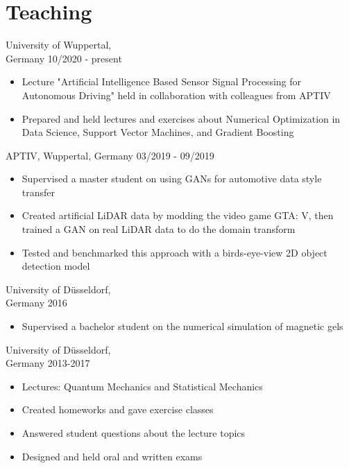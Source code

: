 \documentclass[singlesided,
               paper=a4,
               fontsize=10pt
              ]{my-resume}
\begin{document}
\section[\faBook]{Teaching}
    {University of Wuppertal,\\ Germany}
    {10/2020 - present}
    {\begin{itemize}[leftmargin=2em]
        \item Lecture "Artificial Intelligence Based Sensor Signal Processing for Autonomous Driving" held in collaboration with colleagues from APTIV
        \item Prepared and held lectures and exercises about Numerical Optimization in Data Science, Support Vector Machines, and Gradient Boosting
    \end{itemize}}
%
    {APTIV, Wuppertal, Germany}
    {03/2019 - 09/2019}
    {\begin{itemize}[leftmargin=2em]
        \item Supervised a master student on using GANs for automotive data style transfer
        \item Created artificial LiDAR data by modding the video game GTA: V, then trained a GAN on real LiDAR data to do the domain transform
        \item Tested and benchmarked this approach with a birds-eye-view 2D object detection model
    \end{itemize}}
%
    {University of Düsseldorf, \\ Germany}
    {2016}
    {\begin{itemize}[leftmargin=2em]
        \item Supervised a bachelor student on the numerical simulation of magnetic gels 
    \end{itemize}}
%
    {University of Düsseldorf, \\ Germany}
    {2013-2017}
    {\begin{itemize}[leftmargin=2em]
        \item Lectures: Quantum Mechanics and Statistical Mechanics
        \item Created homeworks and gave exercise classes
        \item Answered student questions about the lecture topics
        \item Designed and held oral and written exams
    \end{itemize}}
\end{document}
